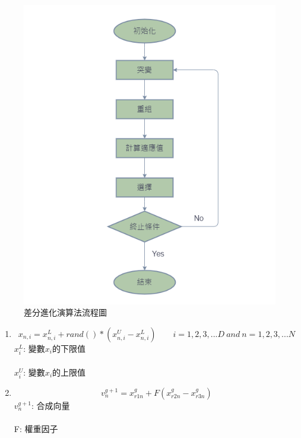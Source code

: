 \documentclass[14pt,a4paper]{report}  %
\newcommand{\fourteen}{\fontsize{14pt}{\baselineskip}\selectfont}%
\begin{document}
{      \begin{figure}[hbt!]
        \centering
        \includegraphics[scale=0.6]{DEflow.png}
        \caption{差分進化演算法流程圖}
        \label{fig_DEflow:scale}
    	\end{figure}
      
      \newpage
      \begin{enumerate}
      \item{\fourteen {初始化(Initialization):設定初始參數值及隨機產生介於上下限值以內的變數。}
      \begin{equation*}
      x_{n,i} = x_{n,i}^{L}+rand()*(x_{n,i}^{U}- x_{n,i}^{L})
	\qquad
i = 1,2,3,...D \ and \ n = 1,2,3,...N
	  \end{equation*}
	  $x_{i}^{L}$: 變數$x_{i}$的下限值
	  \hspace*{\fill} \\
	  \hspace*{\fill} \\
	  $x_{i}^{U}$: 變數$x_{i}$的上限值
	  }
	      
      \item{\fourteen {突變(Mutation):隨機從母體中選取三個目標向量並透過突變權重因子(weight factor)結合而得一合成向量(donor vector)。}
      \begin{equation*}
      v_{n}^{g+1} = x_{r1n}^{g}+F(x_{r2n}^{g}- x_{r3n}^{g})
      \end{equation*}
      $v_{n}^{g+1}$: 合成向量
      \hspace*{\fill} \\
	  \hspace*{\fill} \\
	  F: 權重因子
      }\\
      

\end{enumerate}}
\end{document}
